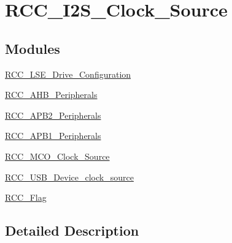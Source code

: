 \hypertarget{group___r_c_c___i2_s___clock___source}{\section{R\-C\-C\-\_\-\-I2\-S\-\_\-\-Clock\-\_\-\-Source}
\label{group___r_c_c___i2_s___clock___source}
}
\subsection*{Modules}
\begin{DoxyCompactItemize}
\item 
\hyperlink{group___r_c_c___l_s_e___drive___configuration}{R\-C\-C\-\_\-\-L\-S\-E\-\_\-\-Drive\-\_\-\-Configuration}
\item 
\hyperlink{group___r_c_c___a_h_b___peripherals}{R\-C\-C\-\_\-\-A\-H\-B\-\_\-\-Peripherals}
\item 
\hyperlink{group___r_c_c___a_p_b2___peripherals}{R\-C\-C\-\_\-\-A\-P\-B2\-\_\-\-Peripherals}
\item 
\hyperlink{group___r_c_c___a_p_b1___peripherals}{R\-C\-C\-\_\-\-A\-P\-B1\-\_\-\-Peripherals}
\item 
\hyperlink{group___r_c_c___m_c_o___clock___source}{R\-C\-C\-\_\-\-M\-C\-O\-\_\-\-Clock\-\_\-\-Source}
\item 
\hyperlink{group___r_c_c___u_s_b___device__clock__source}{R\-C\-C\-\_\-\-U\-S\-B\-\_\-\-Device\-\_\-clock\-\_\-source}
\item 
\hyperlink{group___r_c_c___flag}{R\-C\-C\-\_\-\-Flag}
\end{DoxyCompactItemize}


\subsection{Detailed Description}
